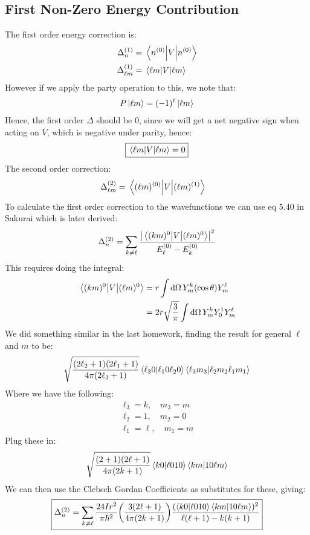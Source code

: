 \documentclass[12pt]{article}
\renewcommand{\l}{\ell}
\begin{document}
\subsection{First Non-Zero Energy Contribution}
The first order energy correction is:
\begin{align*}
  \Delta_{n}^{(1)}&=\mel{n^{(0)}}{V}{n^{(0)}}\\
  \Delta_{\l m}^{(1)}&=\mel{\l m}{V}{\l m}
\end{align*}
However if we apply the party operation to this, we note that:
\begin{align*}
  P\ket{\l m}=(-1)^\l\ket{\l m}
\end{align*}
Hence, the first order $\Delta$ should be $0$, since we will get a net negative sign when acting on $V$, which is negative under parity, hence:
\begin{align}
  \boxed{\mel{\l m}{V}{\l m}=0}
\end{align}
The second order correction:
\begin{align*}
  \Delta_{\l m}^{(2)}&=\mel{(\l m)^{(0)}}{V}{(\l m)^{(1)}}
\end{align*}
To calculate the first order correction to the wavefunctions we can use eq 5.40 in Sakurai which is later derived:
\begin{align*}
  \Delta_n^{(2)}=\sum_{k\neq\l}\frac{\abs{\mel{(km)^{0}}{V}{(\l m)^0}}^2}
  {E_\l^{(0)}-E_k^{(0)}}
\end{align*}
This requires doing the integral:
\begin{align*}
  \mel{(km)^{0}}{V}{(\l m)^0}&=r\int\dd{\Omega}Y^k_m(\cos\theta)Y^\l_m\\
  &=2r\sqrt{\frac{3}{\pi}}\int\dd{\Omega}Y^k_mY_0^1Y^\l_m
\end{align*}
We did something similar in the last homework, finding the result for general $\l$ and $m$ to be:
\begin{align*}
  \sqrt{\frac{(2\l_2+1)(2\l_1+1)}{4\pi(2\l_3+1)}}
  \ip{\l_30}{\l_10\l_20}\ip{\l_3m_3}{\l_2m_2\l_1m_1}
\end{align*}
Where we have the following:
\begin{gather*}
  \l_3=k, \quad m_3=m\\
  \l_2=1, \quad m_2=0\\
  \l_1=\l, \quad m_1=m
\end{gather*}
Plug these in:
\begin{align*}
  \sqrt{\frac{(2+1)(2\l+1)}{4\pi(2k+1)}}
  \ip{k0}{\l010}\ip{km}{10\l m}
\end{align*}
We can then use the Clebsch Gordan Coefficients as substitutes for these, giving:
\begin{align}
  \boxed{\Delta_n^{(2)}=\sum_{k\neq\l}\frac{24Ir^2}{\pi\hbar^2}
  \qty(\frac{3(2\l+1)}{4\pi(2k+1)})
  \frac{(\ip{k0}{\l010}\ip{km}{10\l m})^2}{\l(\l+1)-k(k+1)}}
\end{align}
\end{document}
